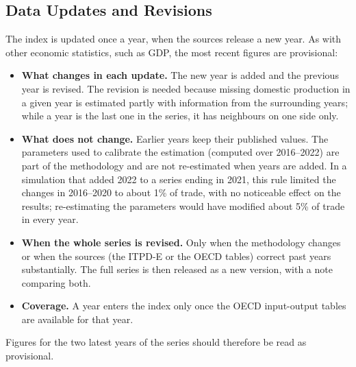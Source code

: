 \documentclass[final,1p,times,authoryear]{elsarticle}
\begin{document}
\subsection{Data Updates and Revisions}\label{subsec:revisions}
The index is updated once a year, when the sources release a new year. As with other economic statistics, such as GDP, the most recent figures are provisional:
\begin{itemize}
    \item \textbf{What changes in each update.} The new year is added and the previous year is revised. The revision is needed because missing domestic production in a given year is estimated partly with information from the surrounding years; while a year is the last one in the series, it has neighbours on one side only.
    \item \textbf{What does not change.} Earlier years keep their published values. The parameters used to calibrate the estimation (computed over 2016--2022) are part of the methodology and are not re-estimated when years are added. In a simulation that added 2022 to a series ending in 2021, this rule limited the changes in 2016--2020 to about 1\% of trade, with no noticeable effect on the results; re-estimating the parameters would have modified about 5\% of trade in every year.
    \item \textbf{When the whole series is revised.} Only when the methodology changes or when the sources (the ITPD-E or the OECD tables) correct past years substantially. The full series is then released as a new version, with a note comparing both.
    \item \textbf{Coverage.} A year enters the index only once the OECD input-output tables are available for that year.
\end{itemize}
Figures for the two latest years of the series should therefore be read as provisional.
\end{document}
